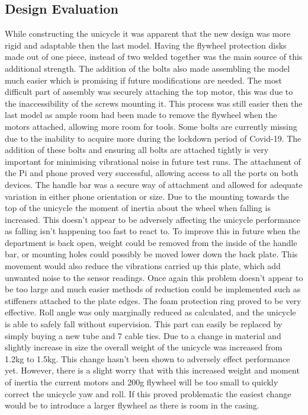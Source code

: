 \documentclass[twoside,twocolumn,12pt]{article}
\begin{document}
\subsection{Design Evaluation}
While constructing the unicycle it was apparent that the new design was more rigid and adaptable then the last model. Having the flywheel protection disks made out of one piece, instead of two welded together was the main source of this additional strength. The addition of the bolts also made assembling the model much easier which is promising if future modifications are needed. The most difficult part of assembly was securely attaching the top motor, this was due to the inaccessibility of the screws mounting it. This process was still easier then the last model as ample room had been made to remove the flywheel when the motors attached, allowing more room for tools. Some bolts are currently missing due to the inability to acquire more during the lockdown period of Covid-19. The addition of these bolts and ensuring all bolts are attached tightly is very important for minimising vibrational noise in future test runs.
\newline
The attachment of the Pi and phone proved very successful, allowing access to all the ports on both devices. The handle bar was a secure way of attachment and allowed for adequate variation in either phone orientation or size. Due to the mounting towards the top of the unicycle the moment of inertia about the wheel when falling is increased. This doesn't appear to be adversely affecting the unicycle performance as falling isn't happening too fast to react to. To improve this in future when the department is back open, weight could be removed from the inside of the handle bar, or mounting holes could possibly be moved lower down the back plate. This movement would also reduce the vibrations carried up this plate, which add unwanted noise to the sensor readings. Once again this problem doesn't appear to be too large and much easier methods of reduction could be implemented such as stiffeners attached to the plate edges.
\newline
The foam protection ring proved to be very effective. Roll angle was only marginally reduced as calculated, and the unicycle is able to safely fall without supervision. This part can easily be replaced by simply buying a new tube \cite{foam} and 7 cable ties.
\newline
Due to a change in material and slightly increase in size the overall weight of the unicycle was increased from 1.2kg to 1.5kg. This change hasn't been shown to adversely effect performance yet. However, there is a slight worry that with this increased weight and moment of inertia the current motors and 200g flywheel will be too small to quickly correct the unicycle yaw and roll. If this proved problematic the easiest change would be to introduce a larger flywheel as there is room in the casing.  
\end{document}
